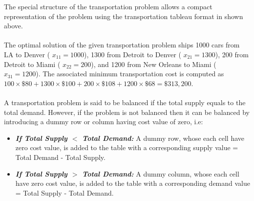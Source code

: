 The special structure of the transportation problem allows a compact representation of the problem using the transportation tableau format in shown above.\\\\
The optimal solution of the given transportation problem ships 1000 cars from LA to Denver ( $ x_{11} = 1000 $), 1300 from Detroit to Denver ( $ x_{21} = 1300 $), 200 from Detroit to Miami ( $ x_{22} = 200 $), and 1200 from New Orleans to Miami ( $ x_{31} = 1200 $). The associated minimum transportation cost is computed as $ 100 \times \$80 + 1300 \times \$100 + 200 \times \$108 + 1200 \times \$68 = \$313,200$.\\\\
A transportation problem is said to be balanced if the total supply equals to the total demand. However, if the problem is not balanced then it can be balanced by introducing a dummy row or column having cost value of zero, i.e:
\begin{itemize}
	 \item \textbf{\textit{If Total Supply $<$ Total Demand:}} A dummy row, whose each cell have zero cost value, is added to the table with a corresponding supply value = Total Demand - Total Supply.
	 \item \textbf{\textit{If Total Supply $ > $ Total Demand:}} A dummy column, whose each cell have zero cost value, is added to the table with a corresponding demand value = Total Supply - Total Demand.
\end{itemize}
%
